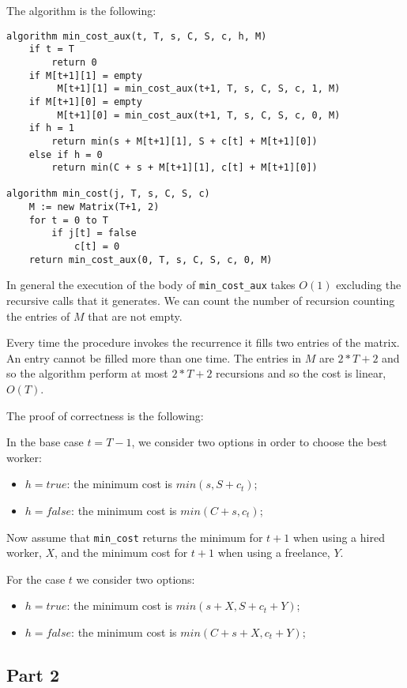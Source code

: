 \documentclass[paper=a4, fontsize=11pt]{scrartcl} %
\numberwithin{equation}{section} %
\numberwithin{figure}{section} %
\numberwithin{table}{section} %
\begin{document}
The algorithm is the following:

\begin{verbatim}
algorithm min_cost_aux(t, T, s, C, S, c, h, M)
    if t = T
        return 0
    if M[t+1][1] = empty
         M[t+1][1] = min_cost_aux(t+1, T, s, C, S, c, 1, M)
    if M[t+1][0] = empty
         M[t+1][0] = min_cost_aux(t+1, T, s, C, S, c, 0, M)
    if h = 1
        return min(s + M[t+1][1], S + c[t] + M[t+1][0])
    else if h = 0
        return min(C + s + M[t+1][1], c[t] + M[t+1][0])

algorithm min_cost(j, T, s, C, S, c)
    M := new Matrix(T+1, 2) 
    for t = 0 to T
        if j[t] = false
            c[t] = 0
    return min_cost_aux(0, T, s, C, S, c, 0, M)
\end{verbatim}

In general the execution of the body of \verb|min_cost_aux| takes $O(1)$ excluding the recursive calls that it generates. We can count the number of recursion counting the entries of $M$ that are not empty.

Every time the procedure invokes the recurrence it fills two entries of the matrix. An entry cannot be filled more than one time. The entries in $M$ are $2*T+2$ and so the algorithm perform at most $2*T+2$ recursions and so the cost is linear, $O(T)$.

The proof of correctness is the following:

In the base case $t = T-1$, we consider two options in order to choose the best worker:
\begin{itemize}
    \item $h = true$: the minimum cost is $min(s, S + c_t)$;
    \item $h = false$: the minimum cost is $min(C + s, c_t)$;
\end{itemize}

Now assume that \verb|min_cost| returns the minimum for $t+1$ when using a hired worker, $X$, and the minimum cost for $t+1$ when using a freelance, $Y$.

For the case $t$ we consider two options:
\begin{itemize}
    \item $h = true$: the minimum cost is $min(s + X, S + c_t + Y)$;
    \item $h = false$: the minimum cost is $min(C + s + X, c_t + Y)$;
\end{itemize}

\subsection*{Part 2}
\end{document}
